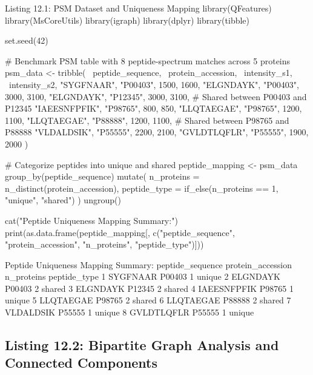 \documentclass[11pt,twoside,openright]{book}
\begin{document}
\begin{rchunk}{Listing 12.1: PSM Dataset and Uniqueness Mapping}
library(QFeatures)
library(MsCoreUtils)
library(igraph)
library(dplyr)
library(tibble)

set.seed(42)

# Benchmark PSM table with 8 peptide-spectrum matches across 5 proteins
psm_data <- tribble(
  ~peptide_sequence, ~protein_accession, ~intensity_s1, ~intensity_s2,
  "SYGFNAAR",        "P00403",           1500,          1600,
  "ELGNDAYK",        "P00403",           3000,          3100,
  "ELGNDAYK",        "P12345",           3000,          3100,  # Shared between P00403 and P12345
  "IAEESNFPFIK",     "P98765",           800,           850,
  "LLQTAEGAE",       "P98765",           1200,          1100,
  "LLQTAEGAE",       "P88888",           1200,          1100,  # Shared between P98765 and P88888
  "VLDALDSIK",       "P55555",           2200,          2100,
  "GVLDTLQFLR",      "P55555",           1900,          2000
)

# Categorize peptides into unique and shared
peptide_mapping <- psm_data %
  group_by(peptide_sequence) %
  mutate(
    n_proteins = n_distinct(protein_accession),
    peptide_type = if_else(n_proteins == 1, "unique", "shared")
  ) %
  ungroup()

cat("Peptide Uniqueness Mapping Summary:\n")
print(as.data.frame(peptide_mapping[, c("peptide_sequence", "protein_accession", "n_proteins", "peptide_type")]))
\end{rchunk}

\begin{routput}
Peptide Uniqueness Mapping Summary:
  peptide\_sequence protein\_accession n\_proteins peptide\_type
1         SYGFNAAR            P00403          1       unique
2         ELGNDAYK            P00403          2       shared
3         ELGNDAYK            P12345          2       shared
4      IAEESNFPFIK            P98765          1       unique
5        LLQTAEGAE            P98765          2       shared
6        LLQTAEGAE            P88888          2       shared
7        VLDALDSIK            P55555          1       unique
8       GVLDTLQFLR            P55555          1       unique
\end{routput}

\subsection{Listing 12.2: Bipartite Graph Analysis and Connected Components}
\end{document}
